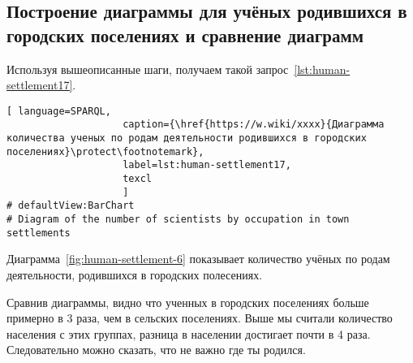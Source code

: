 \subsection{Построение диаграммы для учёных родившихся в городских поселениях и сравнение диаграмм}

Используя вышеописанные шаги, получаем такой запрос~\ref{lst:human-settlement17}.


\begin{lstlisting}[ language=SPARQL, 
                    caption={\href{https://w.wiki/xxxx}{Диаграмма количества ученых по родам деятельности родившихся в городских поселениях}\protect\footnotemark},
                    label=lst:human-settlement17,
                    texcl 
                    ]
# defaultView:BarChart
# Diagram of the number of scientists by occupation in town settlements

\end{lstlisting}%

Диаграмма~\ref{fig:human-settlement-6} показывает количество учёных по родам деятельности, родившихся в городских полесениях.

\begin{figure*}
    \setlength{\fboxsep}{0pt}%
    \setlength{\fboxrule}{1pt}%
	\label{fig:human-settlement-6}
	\caption[Диаграмма количества ученых по родам деятельности родившихся в городских поселениях.]{Диаграмма количества ученых по родам деятельности родившихся в городских поселениях. Ссылка на SPARQL-запрос: \href{https://w.wiki/xxxx}{https://w.wiki/xxxx}}%
\end{figure*} 

Сравнив диаграммы, видно что ученных в городских поселениях больше примерно в 3 раза, чем в сельских поселениях. Выше мы считали количество населения с этих группах, разница в населении достигает почти в 4 раза. Следовательно можно сказать, что не важно где ты родился. 
